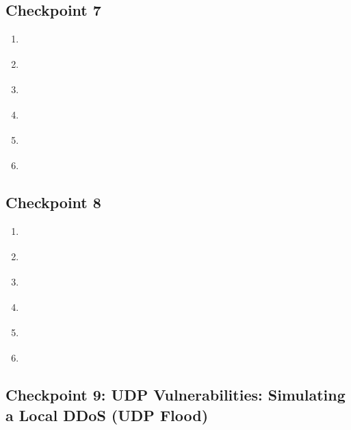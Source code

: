 \subsection{Checkpoint 7}

\begin{enumerate}

\item \textbf{ }
\item \textbf{ }
\item \textbf{ }
\item \textbf{ }
\item \textbf{ }
\item \textbf{ }

\end{enumerate}

\subsection{Checkpoint 8}

\begin{enumerate}

\item \textbf{ }
\item \textbf{ }
\item \textbf{ }
\item \textbf{ }
\item \textbf{ }
\item \textbf{ }

\end{enumerate}

\subsection{Checkpoint 9: UDP Vulnerabilities: Simulating a Local DDoS (UDP Flood)}

